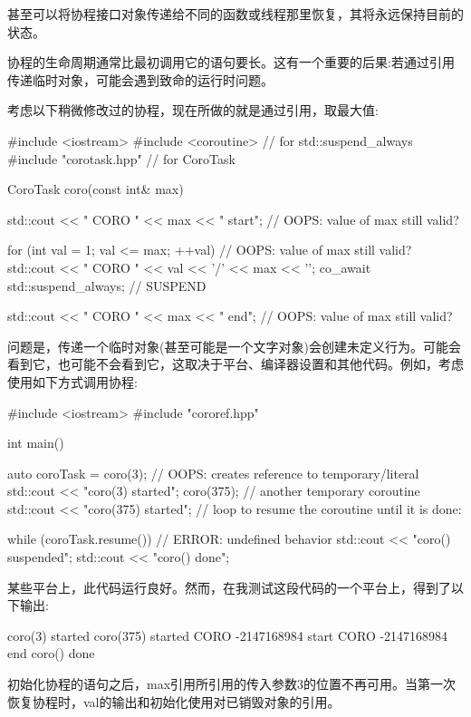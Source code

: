 甚至可以将协程接口对象传递给不同的函数或线程那里恢复，其将永远保持目前的状态。


协程的生命周期通常比最初调用它的语句要长。这有一个重要的后果:若通过引用传递临时对象，可能会遇到致命的运行时问题。

考虑以下稍微修改过的协程，现在所做的就是通过引用，取最大值:


\begin{cpp}
#include <iostream>
#include <coroutine> // for std::suspend_always{}
#include "corotask.hpp" // for CoroTask

CoroTask coro(const int& max)
{
	std::cout << "   CORO " << max << " start\n"; // OOPS: value of max still valid?

	for (int val = 1; val <= max; ++val) { // OOPS: value of max still valid?
		std::cout << " CORO " << val << '/' << max << '\n';
		co_await std::suspend_always{}; // SUSPEND
	}

	std::cout << " CORO " << max << " end\n"; // OOPS: value of max still valid?
}
\end{cpp}

问题是，传递一个临时对象(甚至可能是一个文字对象)会创建未定义行为。可能会看到它，也可能不会看到它，这取决于平台、编译器设置和其他代码。例如，考虑使用如下方式调用协程:


\begin{cpp}
#include <iostream>
#include "cororef.hpp"

int main()
{
	auto coroTask = coro(3); // OOPS: creates reference to temporary/literal
	std::cout << "coro(3) started\n";
	coro(375); // another temporary coroutine
	std::cout << "coro(375) started\n";
	// loop to resume the coroutine until it is done:

	while (coroTask.resume()) { // ERROR: undefined behavior
		std::cout << "coro() suspended\n";
	}
	std::cout << "coro() done\n";
}
\end{cpp}

某些平台上，此代码运行良好。然而，在我测试这段代码的一个平台上，得到了以下输出:

\begin{shell}
coro(3) started
coro(375) started
  CORO -2147168984 start
  CORO -2147168984 end
coro() done
\end{shell}

初始化协程的语句之后，max引用所引用的传入参数3的位置不再可用。当第一次恢复协程时，val的输出和初始化使用对已销毁对象的引用。

